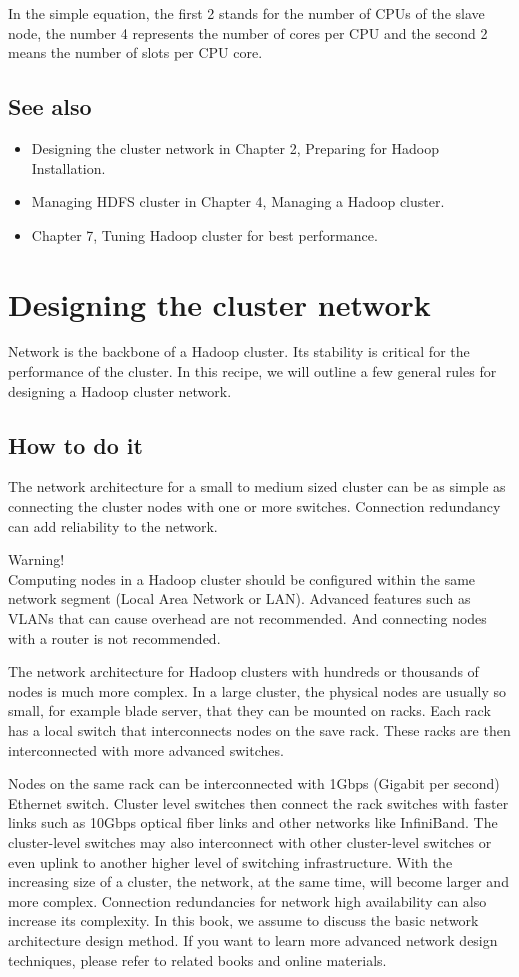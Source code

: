 In the simple equation, the first 2 stands for the number of CPUs of the slave node, the number 4 represents the number of cores per CPU and the second 2 means the number of slots per CPU core.
\subsection*{See also}
\begin{itemize}
  \item Designing the cluster network in Chapter 2, Preparing for Hadoop Installation.
  \item Managing HDFS cluster in Chapter 4, Managing a Hadoop cluster.
  \item Chapter 7, Tuning Hadoop cluster for best performance.
\end{itemize}

\section{Designing the cluster network}
Network is the backbone of a Hadoop cluster. Its stability is critical for the performance of the cluster. In this recipe, we will outline a few general rules for designing a Hadoop cluster network.
\subsection*{How to do it}
The network architecture for a small to medium sized cluster can be as simple as connecting the cluster nodes with one or more switches. Connection redundancy can add reliability to the network.
\begin{warning}
Warning! \\
Computing nodes in a Hadoop cluster should be configured within the same network segment (Local Area Network or LAN). Advanced features such as VLANs that can cause overhead are not recommended. And connecting nodes with a router is not recommended.
\end{warning}
The network architecture for Hadoop clusters with hundreds or thousands of nodes is much more complex. In a large cluster, the physical nodes are usually so small, for example blade server, that they can be mounted on racks. Each rack has a local switch that interconnects nodes on the save rack. These racks are then interconnected with more advanced switches.

Nodes on the same rack can be interconnected with 1Gbps (Gigabit per second) Ethernet switch. Cluster level switches then connect the rack switches with faster links such as 10Gbps optical fiber links and other networks like InfiniBand. The cluster-level switches may also interconnect with other cluster-level switches or even uplink to another higher level of switching infrastructure. With the increasing size of a cluster, the network, at the same time, will become larger and more complex. Connection redundancies for network high availability can also increase its complexity. In this book, we assume to discuss the basic network architecture design method. If you want to learn more advanced network design techniques, please refer to related books and online materials.

